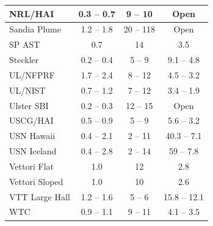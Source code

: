 \begin{table}[p]
\begin{center}
\begin{tabular}{|l|c|c|c|}
NRL/HAI             & 0.3 -- 0.7    & 9 -- 10       & Open          \\ \hline
Sandia Plume        & 1.2 -- 1.8    & 20 -- 118     & Open          \\ \hline
SP AST              & 0.7           & 14            & 3.5           \\ \hline
Steckler            & 0.2 -- 0.4    & 5 -- 9        & 9.1 -- 4.8    \\ \hline
UL/NFPRF            & 1.7 -- 2.4    & 8 -- 12       & 4.5 -- 3.2    \\ \hline
UL/NIST             & 0.7 -- 1.2    & 7 -- 12       & 3.4 -- 1.9    \\ \hline
Ulster SBI          & 0.2 -- 0.3    & 12 -- 15      & Open          \\ \hline
USCG/HAI            & 0.5 -- 0.9    & 5 -- 9        & 5.6 -- 3.2    \\ \hline
USN Hawaii          & 0.4 -- 2.1    & 2 -- 11       & 40.3 -- 7.1   \\ \hline
USN Iceland         & 0.4 -- 2.8    & 2 -- 14       & 59 -- 7.8     \\ \hline
Vettori Flat        & 1.0           & 12            & 2.8           \\ \hline
Vettori Sloped      & 1.0           & 10            & 2.6           \\ \hline
VTT Large Hall      & 1.2 -- 1.6    & 5 -- 6        & 15.8 -- 12.1  \\ \hline
WTC                 & 0.9 -- 1.1    & 9 -- 11       & 4.1 -- 3.5    \\ \hline
\end{tabular}
\end{center}
\label{Numerical_Parameters}
\nopagebreak
\end{table}






